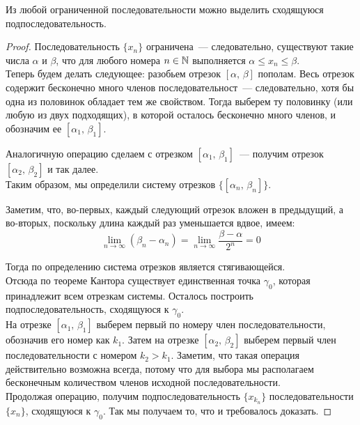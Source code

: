 \begin{theorem}
Из любой ограниченной последовательности можно выделить сходящуюся подпоследовательность.

\begin{proof}
Последовательность \(\{x_{n}\}\) ограничена~--- следовательно,
существуют такие числа \(\alpha\) и \(\beta\), что для любого номера \(n \in \mathbb{N}\)
выполняется \(\alpha \leq x_{n} \leq \beta\). \\

Теперь будем делать следующее: разобьем отрезок \([\alpha, \, \beta]\) пополам.
Весь отрезок содержит бесконечно много членов последовательност~--- следовательно,
хотя бы одна из половинок обладает тем же свойством.
Тогда выберем ту половинку (или любую из двух подходящих), в которой осталось
бесконечно много членов, и обозначим ее \([\alpha_{1}, \, \beta_{1}]\).

Аналогичную операцию сделаем с отрезком \([\alpha_{1}, \, \beta_{1}]\)~---
получим отрезок \([\alpha_{2}, \, \beta_{2}]\) и так далее. \\
Таким образом, мы определили систему отрезков \(\{[\alpha_{n}, \, \beta_{n}]\}\).

Заметим, что, во-первых, каждый следующий отрезок вложен в предыдущий,
а во-вторых, поскольку длина каждый раз уменьшается вдвое, имеем:
\[
\lim_{ n \to \infty } (\beta_{n} - \alpha_{n}) =
\lim_{ n \to \infty } \frac{\beta - \alpha}{2^n} = 0
\]

Тогда по определению система отрезков является стягивающейся.\\
Отсюда по теореме Кантора существует единственная точка \(\gamma_{0}\), которая
принадлежит всем отрезкам системы. Осталось построить подпоследовательность,
сходящуюся к \(\gamma_{0}\).\\

На отрезке \([\alpha_{1}, \, \beta_{1}]\) выберем первый по номеру член последовательности,
обозначив его номер как \(k_{1}\). Затем на отрезке \([\alpha_{2}, \, \beta_{2}]\)
выберем первый член последовательности с номером \(k_{2} > k_{1}\).
Заметим, что такая операция действительно возможна всегда,
потому что для выбора мы располагаем бесконечным количеством членов
исходной последовательности.\\

Продолжая операцию, получим подпоследовательность \(\{x_{k_{n}}\}\)
последовательности \(\{x_{n}\}\), сходящуюся к \(\gamma_{0}\).
Так мы получаем то, что и требовалось доказать.
\end{proof}
\end{theorem}

